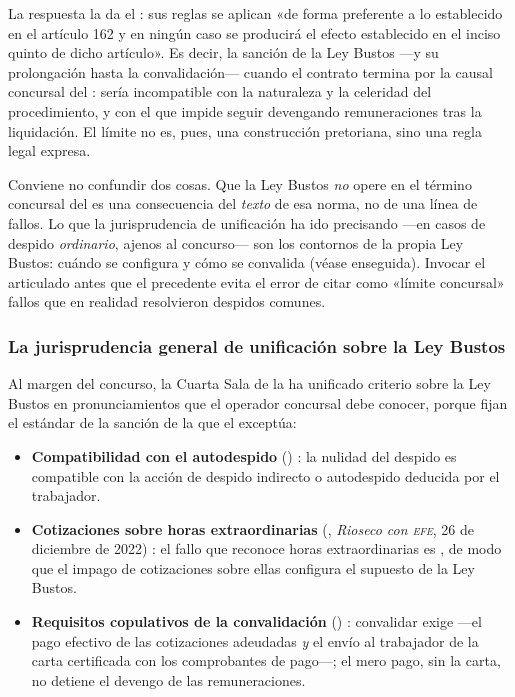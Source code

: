 La respuesta la da el : sus reglas se aplican
«de forma preferente a lo establecido en el artículo 162 y en ningún caso se producirá el efecto
establecido en el inciso quinto de dicho artículo». Es decir, la sanción de la Ley Bustos
---y su prolongación hasta la convalidación---  cuando el contrato termina por la
causal concursal del : sería incompatible con la naturaleza y la celeridad del
procedimiento, y con el \desasimiento{} que impide seguir devengando remuneraciones tras la
liquidación. El límite no es, pues, una construcción pretoriana, sino una regla legal expresa.

\begin{alerta}
Conviene no confundir dos cosas. Que la Ley Bustos \emph{no} opere en el término concursal del
 es una consecuencia del \emph{texto} de esa norma, no de una línea de fallos. Lo que
la jurisprudencia de unificación ha ido precisando ---en casos de despido \emph{ordinario}, ajenos
al concurso--- son los contornos de la propia Ley Bustos: cuándo se configura y cómo se convalida
(véase enseguida). Invocar el articulado antes que el precedente evita el error de citar como
«límite concursal» fallos que en realidad resolvieron despidos comunes.
\end{alerta}

\subsubsection{La jurisprudencia general de unificación sobre la Ley Bustos}

Al margen del concurso, la Cuarta Sala de la \csup{} ha unificado criterio sobre la Ley Bustos en
pronunciamientos que el operador concursal debe conocer, porque fijan el estándar de la sanción de
la que el  exceptúa:

\begin{itemize}
  \item \textbf{Compatibilidad con el autodespido} () \parencite{juris-cs-40689-2016}:
  la nulidad del despido es compatible con la acción de despido indirecto o autodespido deducida por
  el trabajador.
  \item \textbf{Cotizaciones sobre horas extraordinarias} (, \emph{Rioseco con
  \textsc{efe}}, 26 de diciembre de 2022) \parencite{juris-cs-66235-2021}: el fallo que reconoce
  horas extraordinarias es , de modo que el impago de cotizaciones sobre ellas
  configura el supuesto de la Ley Bustos.
  \item \textbf{Requisitos copulativos de la convalidación} ()
  \parencite{juris-cs-139538-2022}: convalidar exige  ---el
  pago efectivo de las cotizaciones adeudadas \emph{y} el envío al trabajador de la carta
  certificada con los comprobantes de pago---; el mero pago, sin la carta, no detiene el devengo de
  las remuneraciones.
\end{itemize}

